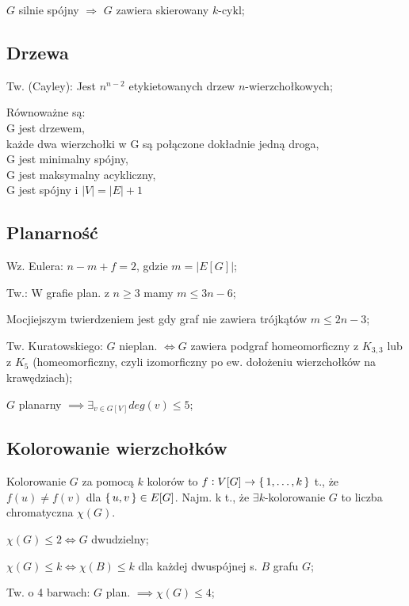 \entry
$G$ silnie spójny $\Rightarrow$ $G$ zawiera skierowany $k\text{-cykl}$;

\subsection{Drzewa}

\entry
Tw. (Cayley): Jest $n^{n-2}$ etykietowanych drzew $n$-wierzchołkowych;

\entry
Równoważne są:\\
G jest drzewem,\\
każde dwa wierzchołki w G są połączone dokładnie jedną droga,\\
G jest minimalny spójny,\\
G jest maksymalny acykliczny,\\
G jest spójny i $|V| = |E| + 1$ 

\subsection{Planarność}

\entry
Wz. Eulera: $n - m + f = 2$, gdzie $m = |E[G]|$;

\entry
Tw.: W grafie plan. z $n \geq 3$ mamy $m \leq 3n -6$;

\entry
Mocjiejszym twierdzeniem jest gdy graf nie zawiera trójkątów $m \leq 2n - 3$;

\entry
Tw. Kuratowskiego: $G$ nieplan. $\iff G$ zawiera podgraf homeomorficzny
  z $K_{3,3}$ lub z $K_5$ (homeomorficzny, czyli
  izomorficzny po ew. dołożeniu wierzchołków na krawędziach);

\entry
$G$ planarny $\implies \exists_{v \in G[V]} deg(v) \leq 5$;

\subsection{Kolorowanie wierzchołków}

\entry
Kolorowanie $G$ za pomocą $k$ kolorów to
  $f: V[G] \rightarrow \set{1, \dots, k}$ t., że $f(u) \neq f(v)$ dla
  $\set{u, v} \in E[G]$. Najm. k t., że $\exists k$-kolorowanie $G$ to liczba
  chromatyczna $\chi (G)$.

\entry
$\chi(G) \leq 2 \Leftrightarrow G$ dwudzielny;

\entry
$\chi(G) \leq k \Leftrightarrow \chi(B) \leq k$ dla każdej dwuspójnej s. $B$
  grafu $G$;

\entry
Tw. o 4 barwach: $G$ plan. $\implies\chi(G)\leq 4$;

